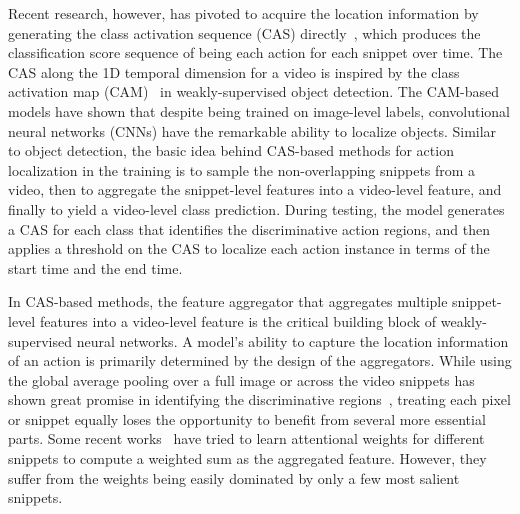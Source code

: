 \documentclass{article} \usepackage{iclr2019_conference,times}
\begin{document}
Recent research, however, has pivoted to acquire the location information by generating the class activation sequence (CAS) directly~\citep{nguyen2017weakly}, which produces the classification score sequence of being each action for each snippet over time. 
The CAS along the 1D temporal dimension for a video is inspired by the class activation map (CAM)~\citep{CAM, zhou2014object, pinheiro2015image, oquab2015object} in weakly-supervised object detection. 
The CAM-based models have shown that despite being trained on image-level labels, convolutional neural networks (CNNs) have the remarkable ability to localize objects. 
Similar to object detection, the basic idea behind CAS-based methods for action localization in the training is to sample the non-overlapping snippets from a video, then to aggregate the snippet-level features into a video-level feature, and finally to yield a video-level class prediction. 
During testing, the model generates a CAS for each class that identifies the discriminative action regions, and then applies a threshold
on the CAS to localize each action instance in terms of the start time and the end time.

In CAS-based methods, the feature aggregator that aggregates multiple snippet-level features into a video-level feature is the critical building block of weakly-supervised neural networks. A model's ability to capture the location information of an action is primarily determined by the design of the aggregators. While using the global average pooling over a full image or across the video snippets has shown great promise in identifying the discriminative regions~\citep{CAM, zhou2014object, pinheiro2015image, oquab2015object}, treating each pixel or snippet equally loses the opportunity to benefit from several more essential parts. Some recent works~\citep{nguyen2017weakly,zhu2017soft} have tried to learn attentional weights for different snippets to compute a weighted sum as the aggregated feature. However, they suffer from the weights being easily dominated by only a few most salient snippets.
\end{document}
